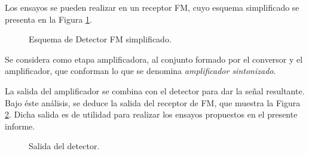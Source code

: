     Los ensayos se pueden realizar en un receptor FM, cuyo esquema simplificado se presenta 
    en la Figura \ref{fig:ReceptorSimplificado}.
      \begin{figure}[H]
        \centering
          \caption{Esquema de Detector FM simplificado.}
          \label{fig:ReceptorSimplificado}
      \end{figure}

    Se considera como etapa amplificadora, al conjunto formado por el conversor 
    y el amplificador, que conforman lo que se denomina \textit{amplificador sintonizado}.

    La salida del amplificador se combina con el detector para dar la señal resultante. 
    Bajo éste análisis, se deduce la salida del receptor de FM, que muestra la 
    Figura \ref{fig:FdeTReceptor}. Dicha salida es de utilidad para realizar los ensayos 
    propuestos en el presente informe.

      \begin{figure}[H]
        \centering
          \caption{Salida del detector.}
          \label{fig:FdeTReceptor}
      \end{figure}

